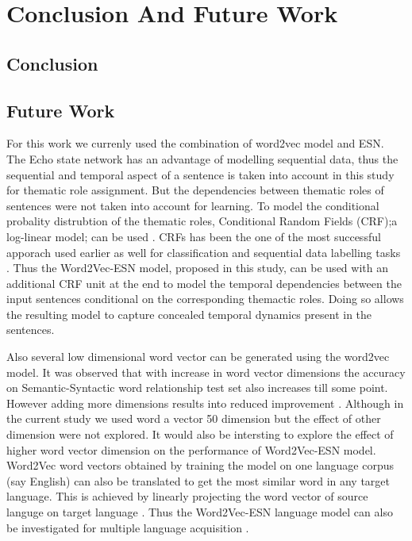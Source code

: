 \chapter{Conclusion And Future Work}\label{conclusion}


\section{Conclusion}


 

\section{Future Work}

For this work we currenly used the combination of word2vec model and ESN. The Echo state network has an advantage of modelling sequential data, thus the sequential and temporal aspect of a sentence is taken into account in this study for thematic role assignment. But the dependencies between thematic roles of sentences were not taken into account for learning. To model the conditional probality distrubtion of the thematic roles, Conditional Random Fields (CRF);a log-linear model; can be used \cite{crf:intro:sutton}. CRFs has been the one of the most successful apporach used earlier as well for classification and sequential data labelling tasks \cite{end-to-end, esn:esn_crf}. Thus the Word2Vec-ESN model, proposed in this study, can be used with an additional CRF unit at the end to model the temporal dependencies between the input sentences conditional on the corresponding themactic roles. Doing so allows the resulting model to capture concealed temporal dynamics present in the sentences\cite{esn:esn_crf}. 

Also several low dimensional word vector can be generated using the word2vec model. It was observed that with increase in word vector dimensions the accuracy on Semantic-Syntactic word relationship test set \cite{w2v:regularities_in_word_representations}  also increases till some point. However adding more dimensions results into reduced improvement \cite{w2v:mikolov_2013_efficient}. Although in the current study we used word a vector 50 dimension but the effect of other dimension were not explored. It would also be intersting to explore the effect of higher word vector dimension on the performance of Word2Vec-ESN model. Word2Vec word vectors obtained by training the model on one language corpus (say English) can also be translated to get the most similar word in any target language. This is achieved by linearly projecting the word vector of source languge on target language \cite{w2v:language_similarities}. Thus the Word2Vec-ESN language model can also be investigated for multiple language acquisition \cite{hinaut_multiple_lang}. 